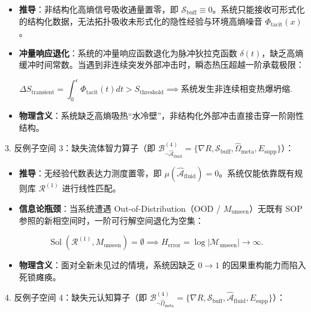 \documentclass[11pt,a4paper,oneside]{ctexart}
\begin{document}
\begin{itemize}\item \textbf{推导}：非结构化高熵信号吸收通量置零，即 $\mathcal{S}_{\text{buff}} \equiv 0$。系统只能接收可形式化的结构化数据，无法拓扑吸收未形式化的隐性经验与环境高熵噪音 $\Phi_{\text{tacit}}(x)$。\end{itemize}
\begin{itemize}\item \textbf{冲量响应退化}：系统的冲量响应函数退化为脉冲狄拉克函数 $\delta(t)$，缺乏高熵缓冲时间常数。当遇到非连续突发外部冲击时，瞬态热压超越一阶承载极限：\end{itemize}
\begin{equation}
\Delta S_{\text{transient}} = \int_0^{\epsilon} \Phi_{\text{tacit}}(t) dt > S_{\text{threshold}} \implies \text{系统发生非连续相变热爆坍缩}.
\end{equation}
\begin{itemize}\item \textbf{物理含义}：系统缺乏高熵吸热“水冷壁”，非结构化外部冲击直接击穿一阶刚性结构。\end{itemize}

3. \textit{}反例子空间 3：缺失流体智力算子（即 $\mathcal{B}_{\neg \hat{\mathcal{A}}_{\text{fluid}}}^{(4)} = \{ \nabla R, \mathcal{S}_{\text{buff}}, \hat{\Omega}_{\text{meta}}, E_{\text{supp}} \}$）\textit{}：

\begin{itemize}\item \textbf{推导}：无经验代数表达力测度置零，即 $\mu(\hat{\mathcal{A}}_{\text{fluid}}) = 0$。系统仅能依靠既有规则库 $\mathcal{R}^{(1)}$ 进行线性匹配。\end{itemize}
\begin{itemize}\item \textbf{信息论瓶颈}：当系统遭遇 Out-of-Distribution（OOD / $M_{\text{unseen}}$）无既有 SOP 参照的新相空间时，一阶可行解空间退化为空集：\end{itemize}
\begin{equation}
\operatorname{Sol}(\mathcal{R}^{(1)}, M_{\text{unseen}}) = \emptyset \implies H_{\text{error}} = \log |\mathcal{M}_{\text{unseen}}| \to \infty.
\end{equation}
\begin{itemize}\item \textbf{物理含义}：面对全新未见过的情境，系统因缺乏 $0 \to 1$ 的因果重构能力而陷入死锁瘫痪。\end{itemize}

4. \textit{}反例子空间 4：缺失元认知算子（即 $\mathcal{B}_{\neg \hat{\Omega}_{\text{meta}}}^{(4)} = \{ \nabla R, \mathcal{S}_{\text{buff}}, \hat{\mathcal{A}}_{\text{fluid}}, E_{\text{supp}} \}$）\textit{}：
\end{document}
